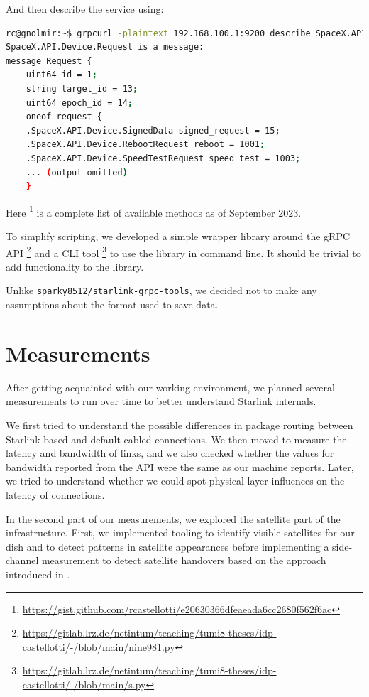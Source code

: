 \documentclass[IN,11pt,twoside,openright,idp,english]{tumthesis}
\begin{document}
And then describe the service using:
    
\begin{lstlisting}[language=bash]
rc@gnolmir:~$ grpcurl -plaintext 192.168.100.1:9200 describe SpaceX.API.Device.Request
SpaceX.API.Device.Request is a message:
message Request {
    uint64 id = 1;
    string target_id = 13;
    uint64 epoch_id = 14;
    oneof request {
    .SpaceX.API.Device.SignedData signed_request = 15;
    .SpaceX.API.Device.RebootRequest reboot = 1001;
    .SpaceX.API.Device.SpeedTestRequest speed_test = 1003;
    ... (output omitted)
    }
\end{lstlisting}
    
Here \footnote{\url{https://gist.github.com/rcastellotti/e20630366dfeaeada6cc2680f562f6ac}} is a complete list of available methods as of September 2023.
    
To simplify scripting, we developed a simple wrapper library around the gRPC API  \footnote{\url{https://gitlab.lrz.de/netintum/teaching/tumi8-theses/idp-castellotti/-/blob/main/nine981.py}} and a CLI tool \footnote{\url{https://gitlab.lrz.de/netintum/teaching/tumi8-theses/idp-castellotti/-/blob/main/s.py}} to use the library in command line. It should be trivial to add functionality to the library.

Unlike \texttt{sparky8512/starlink-grpc-tools}, we decided not to make any assumptions about the format used to save data.
    
\chapter{Measurements}

After getting acquainted with our working environment, we planned several measurements to run over time to better understand Starlink internals. 
    
We first tried to understand the possible differences in package routing between Starlink-based and default cabled connections. We then moved to measure the latency and bandwidth of links, and we also checked whether the values for bandwidth reported from the API were the same as our machine reports. Later, we tried to understand whether we could spot physical layer influences on the latency of connections.  
    
In the second part of our measurements, we explored the satellite part of the infrastructure. First, we implemented tooling to identify visible satellites for our dish and to detect patterns in satellite appearances before implementing a side-channel measurement to detect satellite handovers based on the approach introduced in \cite{izhikevich2023democratizing}.
    
\end{document}
